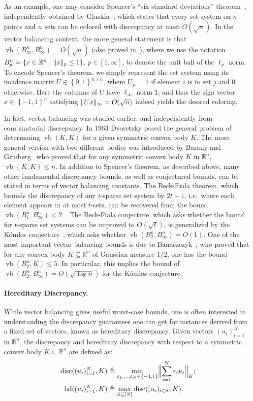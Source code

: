 \documentclass[11pt]{article}
\newcommand{\R}{{\mathbb{R}}}
\newcommand\eps{\varepsilon}
\newcommand{\eqdef}{\triangleq}
\newcommand{\set}[1]{\left\{ #1 \right\}}
\DeclareMathOperator{\disc}{disc}
\DeclareMathOperator{\hd}{hd}
\DeclareMathOperator{\vb}{vb}
\DeclarePairedDelimiter\norm{\lVert}{\rVert}
\begin{document}
As an example, one may consider Spencer's ``six standard deviations'' theorem~\cite{Spencer}, independently
obtained by Gluskin~\cite{gluskin}, which states that every set system on $n$
points and $n$ sets can be colored with discrepancy at most $O(\sqrt{n})$. In
the vector balancing context, the more general statement is that
$\vb(B_\infty^n,B_\infty^n) = O(\sqrt{n})$ (also proved
in~\cite{Spencer,gluskin}), where we use the notation $B_p^n = \set{x \in \R^n:
\norm{x}_p \leq 1}$, $p \in [1,\infty]$, to denote the unit ball of the $\ell_p$
norm. To encode Spencer's theorem, we simply represent the set system using its
incidence matrix $U \in \set{0,1}^{n \times n}$, where $U_{ji} = 1$ if element
$i$ is in set $j$ and $0$ otherwise. Here the columns of $U$ have $\ell_\infty$
norm $1$, and thus the sign vector $x \in \set{-1,1}^n$ satisfying $\norm{U
x}_\infty = O(\sqrt{n})$ indeed yields the desired coloring.   

In fact, vector balancing was studied earlier, and independently from
combinatorial discrepancy. In 1963 Dvoretzky posed the general problem
of determining $\vb(K, K)$ for a given symmetric convex body $K$. The
more general version with two different bodies was introduced by
Barany and Grinberg~\cite{baranygrinberg} who proved that for any
symmetric convex body $K$ in $\R^n$, $\vb(K, K) \le n$.  In addition
to Spencer's theorem, as described above, many other fundamental
discrepancy bounds, as well as conjectured bounds, can be stated in
terms of vector balancing constants. The Beck-Fiala theorem, which
bounds the discrepancy of any $t$-sparse set system by $2t-1$,
i.e.~where each element appears in at most $t$-sets, can be recovered
from the bound $\vb(B_1^n,B_\infty^n) < 2$~\cite{beckfiala}. The
Beck-Fiala conjecture, which asks whether the bound for $t$-sparse set
systems can be improved to $O(\sqrt{t})$, is generalized by the
K{\'o}mlos conjecture~\cite{spencer-lectures}, which asks whether
$\vb(B_2^n,B_\infty^n) = O(1)$. One of the most important vector
balancing bounds is due to Banaszczyk~\cite{bana}, who proved that for
any convex body $K \subseteq \R^n$ of Gaussian measure $1/2$, one has
the bound $\vb(B_2^n,K) \leq 5$. In particular, this implies the bound
of $\vb(B_2^n,B_\infty^n) = O(\sqrt{\log n})$ for the K{\'o}mlos
conjecture.



\paragraph{\bf Hereditary Discrepancy.} While vector balancing gives useful
worst-case bounds, one is often interested in understanding the discrepancy
guarantees one can get for instances derived from a fixed set of vectors, known
as hereditary discrepancy. Given vectors $(u_i)_{i=1}^N$ in $\R^n$, the
discrepancy and hereditary discrepancy with respect to a symmetric convex body
$K \subseteq \R^n$ are defined as:
\begin{align*}
\disc((u_i)_{i = 1}^N,K) &\eqdef \min_{\eps_1, \ldots,\eps_N \in
  \{-1, 1\}}
\Bigl\|\sum_{i = 1}^N{\eps_i u_i}\Bigr\|_{K};\\
\hd((u_i)_{i = 1}^N, K) &\eqdef \max_{S \subseteq [N]}{\disc((u_i)_{i \in S}, K)}.
\end{align*}
\end{document}
